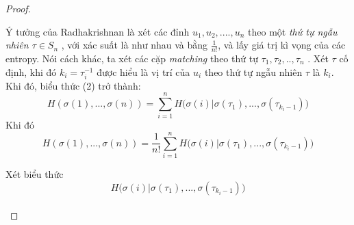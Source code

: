 \documentclass[a4paper, 12pt]{report}
\begin{document}
\begin{proof}
\begin{figure}
\begin{center}
\end{center}
\end{figure}
Ý tưởng của Radhakrishnan là xét các đỉnh  $u_{1}, u_{2}, ....  , u_{n}$ theo một \textit{thứ tự ngẫu nhiên $\tau \in S_{n}$} , với xác suất là như nhau và bằng $\frac{1}{n!}$, và lấy giá trị kì vọng của các entropy. Nói cách khác, ta xét các cặp \textit{matching} theo thứ tự $\tau_{1},\tau_{2},..,\tau_{n}$ . Xét $\tau$ cố định, khi đó $k_{i} = \tau ^{-1}_{i}$ được hiểu là vị trí của $u_{i}$ theo thứ tự ngẫu nhiên $\tau$ là $k_{i}$. Khi đó, biểu thức (2) trở thành:
\begin{equation*}
	H(\sigma(1),...,\sigma(n)) = \displaystyle \sum_{i=1}^{n}H\Big(\sigma (i)| \sigma (\tau_{1}),...,\sigma (\tau_{k_{i}-1})\Big)
\end{equation*}
Khi đó
\begin{equation*}
	H(\sigma(1),...,\sigma(n)) = \frac{1}{n!}\displaystyle \sum_{i=1}^{n}H\Big(\sigma (i)| \sigma (\tau_{1}),...,\sigma (\tau_{k_{i}-1})\Big)
\end{equation*}

Xét biểu thức 
\begin{equation}
H\Big(\sigma (i)| \sigma (\tau_{1}),...,\sigma (\tau_{k_{i}-1})\Big)
\end{equation}
\\


\end{proof}
\end{document}
